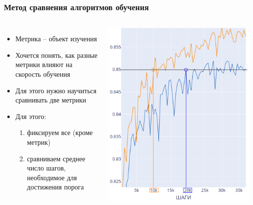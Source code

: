 \documentclass{beamer}
\begin{document}
\begin{frame}
	\frametitle{Метод сравнения алгоритмов обучения}
	\begin{columns}
		
		\begin{itemize}
			\item Метрика -- объект изучения
			\item Хочется понять, как разные метрики влияют на скорость обучения
			\item Для этого нужно научиться сравнивать две метрики
			\item Для этого:
				\begin{enumerate}
					\item фиксируем все (кроме метрик)
					\item сравниваем среднее число шагов, необходимое для достижения порога
				\end{enumerate}
		\end{itemize}
		
		\includegraphics[scale=0.25]{compare}
	\end{columns}
\end{frame}
\end{document}

